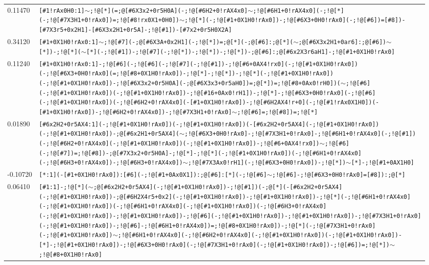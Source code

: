 \begin{longtable}{>{\baselineskip=10pt}p{} >{\baselineskip=10pt}p{}}
0.11470 & \texttt{[\#1!rAx0H0:1]$\sim$;!@[*](=;@[\#6X3x2+0r5H0A](-;!@[\#6H2+0!rAX4x0]$\sim$;!@[\#6H1+0!rAX4x0](-;!@[*](-;!@[\#7X3H1+0!rAx0])=;!@[\#8!rx0X1+0H0])$\sim$;!@[*](-;!@[\#1+0X1H0!rAx0])-;!@[\#6X3+0H0!rAx0](-;!@[\#6])=[\#8])-[\#7X3r5+0x2H1]-[\#6X3x2H1+0r5A]-;!@[\#1])-[\#7x2+0r5H0X2A]} \\ 
0.34120 & \texttt{[\#1+0X1H0!rAx0:1]$\sim$;!@[\#7](-;@[\#6X3A+0x2H1](-;!@[*])=;@[*](-;@[\#6]:;@[*]($\sim$;@[\#6X3x2H1+0ar6]:;@[\#6])$\sim$[*])-;!@[*]($\sim$[*](-;!@[\#1])-;!@[\#7](-;!@[*])-;!@[*])-;!@[*])-;@[\#6]:;@[\#6x2X3r6aH1]-;!@[\#1+0X1H0!rAx0]} \\ 
0.11240 & \texttt{[\#1+0X1H0!rAx0:1]-;!@[\#6](-;!@[\#6](-;!@[\#7](-;!@[\#1])-;!@[\#6+0AX4!rx0](-;!@[\#1+0X1H0!rAx0])(-;!@[\#6X3+0H0!rAx0](=;!@[\#8+0X1H0!rAx0])-;!@[*]-;!@[*])-;!@[*](-;!@[\#1+0X1H0!rAx0])(-;!@[\#1+0X1H0!rAx0])-;!@[\#6X3x2+0r5H0A](-;@[\#6X3x3+0r5aH0])=;@[*])=;!@[\#8+0Ax0!rH0])($\sim$;!@[\#6](-;!@[\#1+0X1H0!rAx0])(-;!@[\#1+0X1H0!rAx0])-;!@[\#16+0Ax0!rH1])-;!@[*]-;!@[\#6X3+0H0!rAx0](-;!@[\#6](-;!@[\#1+0X1H0!rAx0])(-;!@[\#6H2+0!rAX4x0](-[\#1+0X1H0!rAx0])-;!@[\#6H2AX4!r+0](-;!@[\#1!rAx0X1H0])(-[\#1+0X1H0!rAx0])-;!@[\#6H2+0!rAX4x0])-;!@[\#7X3H1+0!rAx0]$\sim$;!@[\#6]=;!@[\#8])=;!@[*]} \\ 
0.01890 & \texttt{[\#6x2H2+0r5AX4:1](-;!@[\#1+0X1H0!rAx0])(-;!@[\#1+0X1H0!rAx0])(-[\#6x2H2+0r5AX4](-;!@[\#1+0X1H0!rAx0])(-;!@[\#1+0X1H0!rAx0])-;@[\#6x2H1+0r5AX4]($\sim$;!@[\#6X3+0H0!rAx0]-;!@[\#7X3H1+0!rAx0]-;!@[\#6H1+0!rAX4x0](-;!@[\#1])(-;!@[\#6H2+0!rAX4x0](-;!@[\#1+0X1H0!rAx0])(-;!@[\#1+0X1H0!rAx0])-;!@[\#6+0AX4!rx0])$\sim$;!@[\#6](-;!@[\#7])=;!@[\#8])-;@[\#7X3x2+0r5H0A]-;!@[*]-;!@[*](-;!@[\#1+0X1H0!rAx0])(-;!@[\#6H1+0!rAX4x0](-;!@[\#6H3+0!rAX4x0])-;!@[\#6H3+0!rAX4x0])$\sim$;!@[\#7X3Ax0!rH1](-;!@[\#6X3+0H0!rAx0])-;!@[*])$\sim$[*]-;!@[\#1+0AX1H0]} \\ 
-0.10720 & \texttt{[*:1](-[\#1+0X1H0!rAx0]):[\#6](-;!@[\#1+0Ax0X1]):;@[\#6]:[*](-;!@[\#6]$\sim$;!@[\#6]-;!@[\#6X3+0H0!rAx0]=[\#8]):;@[*]} \\ 
0.06410 & \texttt{[\#1:1]-;!@[*]($\sim$;@[\#6x2H2+0r5AX4](-;!@[\#1+0X1H0!rAx0])-;!@[\#1])(-;@[*](-[\#6x2H2+0r5AX4](-;!@[\#1+0X1H0!rAx0])-;@[\#6H2X4r5+0x2](-;!@[\#1+0X1H0!rAx0])-;!@[\#1+0X1H0!rAx0])-;!@[*](-;!@[\#6H1+0!rAX4x0](-;!@[\#1+0X1H0!rAx0])(-;!@[\#6H1+0!rAX4x0](-;!@[\#1+0X1H0!rAx0])(-;!@[\#6H3+0!rAX4x0](-;!@[\#1+0X1H0!rAx0])-;!@[\#1+0X1H0!rAx0])-;!@[\#6](-;!@[\#1+0X1H0!rAx0])-;!@[\#1+0X1H0!rAx0])-;!@[\#7X3H1+0!rAx0](-;!@[\#1+0X1H0!rAx0])-;!@[\#6]-;!@[\#6H1+0!rAX4x0])=;!@[\#8+0X1H0!rAx0])-;!@[*](-;!@[\#7X3H1+0!rAx0](-;!@[\#1+0X1H0!rAx0])$\sim$;!@[\#6H1+0!rAX4x0](-;!@[\#6H2+0!rAX4x0](-;!@[\#1+0X1H0!rAx0])(-;!@[\#1+0X1H0!rAx0])-[*]-;!@[\#1+0X1H0!rAx0])-;!@[\#6X3+0H0!rAx0](-;!@[\#7X3H1+0!rAx0](-;!@[\#1+0X1H0!rAx0])-;!@[\#6])=;!@[*])$\sim$;!@[\#8+0X1H0!rAx0]} \\ 

\end{longtable}
